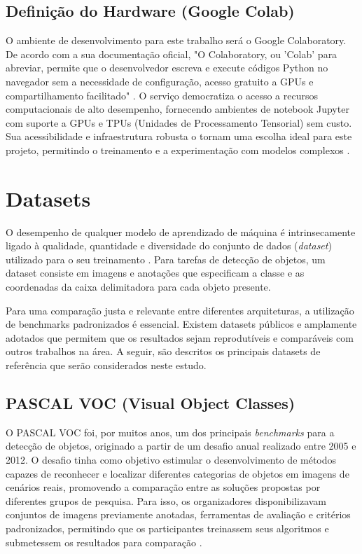 \subsection{Definição do Hardware (Google Colab)}

O ambiente de desenvolvimento para este trabalho será o Google Colaboratory. De acordo com a
sua documentação oficial, "O Colaboratory, ou 'Colab' para abreviar, permite que o desenvolvedor  
escreva e execute códigos Python no navegador sem a necessidade de configuração, acesso gratuito 
a GPUs e compartilhamento facilitado" \cite{google2024colab}. O serviço democratiza o acesso a recursos
computacionais de alto desempenho, fornecendo ambientes de notebook Jupyter com suporte a GPUs
e TPUs (Unidades de Processamento Tensorial) sem custo. Sua acessibilidade e infraestrutura
robusta o tornam uma escolha ideal para este projeto, permitindo o treinamento e a
experimentação com modelos complexos \cite{goodfellow2016deep}.

\section{Datasets}

O desempenho de qualquer modelo de aprendizado de máquina é intrinsecamente ligado à
qualidade, quantidade e diversidade do conjunto de dados (\textit{dataset}) utilizado para o
seu treinamento \cite{goodfellow2016deep}. Para tarefas de detecção de objetos, um dataset
consiste em imagens e anotações que especificam a classe e as coordenadas da caixa
delimitadora para cada objeto presente.

Para uma comparação justa e relevante entre diferentes arquiteturas, a utilização de
benchmarks padronizados é essencial. Existem datasets públicos e amplamente adotados que permitem
que os resultados sejam reprodutíveis e comparáveis com outros trabalhos na área. A seguir,
são descritos os principais datasets de referência que serão considerados neste estudo.

\subsection{PASCAL VOC (Visual Object Classes)}

O PASCAL VOC foi, por muitos anos, um dos principais \textit{benchmarks} para a detecção
de objetos, originado a partir de um desafio anual realizado entre 2005 e 2012. O desafio
tinha como objetivo estimular o desenvolvimento de métodos capazes de reconhecer e localizar
diferentes categorias de objetos em imagens de cenários reais, promovendo a comparação entre
as soluções propostas por diferentes grupos de pesquisa. Para isso, os organizadores
disponibilizavam conjuntos de imagens previamente anotadas, ferramentas de avaliação e
critérios padronizados, permitindo que os participantes treinassem seus algoritmos e
submetessem os resultados para comparação \cite{everingham2010pascal}.

